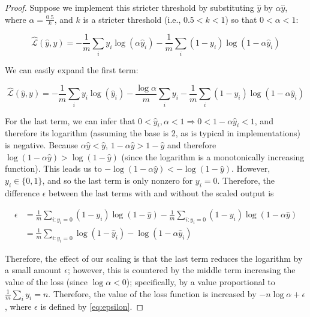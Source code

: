 \documentclass[10pt,compsoc,twocolumn]{IEEEtran}
\begin{document}
\begin{proof}
Suppose we implement this stricter threshold by substituting $\hat{y}$ by $\alpha\hat{y}$, where $\alpha = \frac{0.5}{k}$, and $k$ is a stricter threshold (i.e., $0.5 < k < 1$) so that $0 < \alpha < 1$:

\[
    \hat{\mathcal{L}}(\hat{y}, y) = -\frac{1}{m} \sum\limits_i y_i \log (\alpha\hat{y}_i) -\frac{1}{m} \sum\limits_i (1-y_i)\log (1-\alpha\hat{y}_i)
\]

We can easily expand the first term:

\[
    \hat{\mathcal{L}}(\hat{y}, y) = -\frac{1}{m} \sum\limits_i y_i \log (\hat{y}_i) -\frac{\log \alpha}{m} \sum\limits_i y_i -\frac{1}{m} \sum\limits_i (1-y_i)\log (1-\alpha\hat{y}_i)
\]

For the last term, we can infer that $0 < \hat{y}_i, \alpha < 1 \Rightarrow 0 < 1 - \alpha \hat{y}_i < 1$, and therefore its logarithm (assuming the base is 2, as is typical in implementations) is negative. Because $\alpha \hat{y} < \hat{y}$, $1 - \alpha \hat{y} > 1 - \hat{y}$ and therefore $\log (1 - \alpha \hat{y}) > \log (1 - \hat{y})$ (since the logarithm is a monotonically increasing function). This leads us to $-\log (1 - \alpha \hat{y}) < -\log (1 - \hat{y})$. However, $y_i \in \{0, 1\}$, and so the last term is only nonzero for $y_i = 0$. Therefore, the difference $\epsilon$ between the last terms with and without the scaled output is

\begin{align}
    \epsilon &= \frac{1}{m}\sum\limits_{i:y_i = 0} (1-y_i) \log (1 - \hat{y}) - \frac{1}{m}\sum\limits_{i:y_i=0} (1-y_i) \log (1-\alpha \hat{y}) \nonumber \\
    &= \frac{1}{m}\sum\limits_{i:y_i=0} \log(1-\hat{y}_i) -\log(1-\alpha\hat{y}_i)  \label{eq:epsilon}
\end{align}

Therefore, the effect of our scaling is that the last term reduces the logarithm by a small amount $\epsilon$; however, this is countered by the middle term increasing the value of the loss (since $\log \alpha < 0$); specifically, by a value proportional to $\frac{1}{m}\sum_i y_i = n$. Therefore, the value of the loss function is increased by $-n\log\alpha +\epsilon$, where $\epsilon$ is defined by \eqref{eq:epsilon}.
\end{proof}

\clearpage

\setcounter{page}{1}
\normalsize
\twocolumn
\end{document}
